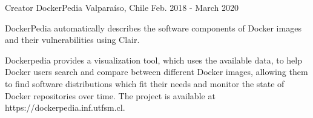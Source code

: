 \begin{cventries}
  \cventry
    {Creator}
    {DockerPedia}
    {Valparaíso, Chile}
    {Feb. 2018 - March 2020}
    {
      \begin{cvitems}
        \item {DockerPedia automatically describes the software components of Docker images and their vulnerabilities using Clair.}
        \item {Dockerpedia provides a visualization tool, which uses the available data, to help Docker users search and compare between different Docker images, allowing them to find software distributions which fit their needs and monitor the state of Docker repositories over time. The project is available at https://dockerpedia.inf.utfsm.cl.}
      \end{cvitems}
    }

\end{cventries}
